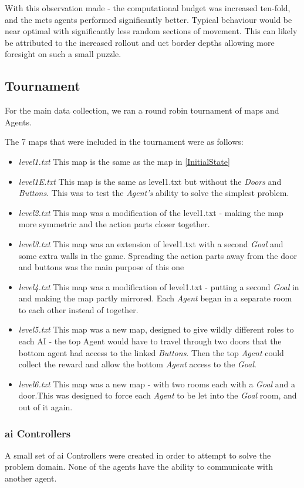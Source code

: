\documentclass{IEEEtran}
\begin{document}
With this observation made - the computational budget was increased ten-fold, and the \gls{mcts} agents performed significantly better. Typical behaviour would be near optimal with significantly less random sections of movement. This can likely be attributed to the increased rollout and uct border depths allowing more foresight on such a small puzzle.
\subsection{Tournament}
For the main data collection, we ran a round robin tournament of maps and Agents.

The 7 maps that were included in the tournament were as follows:
\begin{itemize}
\item{\emph{level1.txt} This map is the same as the map in \ref{InitialState}}
\item{\emph{level1E.txt} This map is the same as level1.txt but without the \emph{Doors} and \emph{Buttons}. This was to test the \emph{Agent's} ability to solve the simplest problem.}
\item{\emph{level2.txt} This map was a modification of the level1.txt - making the map more symmetric and the action parts closer together.}
\item{\emph{level3.txt} This map was an extension of level1.txt with a second \emph{Goal} and some extra walls in the game. Spreading the action parts away from the door and buttons was the main purpose of this one}
\item{\emph{level4.txt} This map was a modification of level1.txt - putting a second \emph{Goal} in and making the map partly mirrored. Each \emph{Agent} began in a separate room to each other instead of together.}
\item{\emph{level5.txt} This map was a new map, designed to give wildly different roles to each AI - the top Agent would have to travel through two doors that the bottom agent had access to the linked \emph{Buttons}. Then the top \emph{Agent} could collect the reward and allow the bottom \emph{Agent} access to the \emph{Goal}.}
\item{\emph{level6.txt} This map was a new map - with two rooms each with a \emph{Goal} and a door.This was designed to force each \emph{Agent} to be let into the \emph{Goal} room, and out of it again.}
\end{itemize}

\subsubsection{\gls{ai} Controllers}
A small set of \gls{ai} Controllers were created in order to attempt to solve the problem domain. None of the agents have the ability to communicate with another agent.
\end{document}
